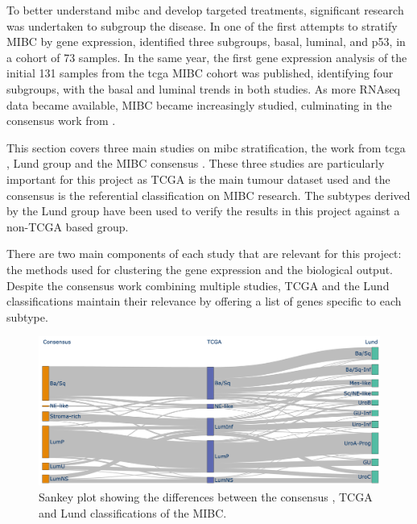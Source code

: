 
To better understand \acrlong{mibc} and develop targeted treatments, significant research was undertaken to subgroup the disease. In one of the first attempts to stratify MIBC by gene expression, \citet{Choi2014-ed} identified three subgroups, basal, luminal, and p53, in a cohort of 73 samples. In the same year, the first gene expression analysis of the initial 131 samples from the \acrlong{tcga} MIBC cohort was published, identifying four subgroups, with the basal and luminal trends in both studies. As more RNAseq data became available, MIBC became increasingly studied, culminating in the consensus work from \citep{Kamoun2020-tj}.


This section covers three main studies on \acrshort{mibc} stratification, the work from \acrshort{tcga} \citep{Robertson2017-mg}, Lund group \citep{Marzouka2018-ge} and the MIBC consensus \citep{Kamoun2020-tj}. These three studies are particularly important for this project as TCGA is the main tumour dataset used and the consensus is the referential classification on MIBC research. The subtypes derived by the Lund group have been used to verify the results in this project against a non-TCGA based group.

There are two main components of each study that are relevant for this project: the methods used for clustering the gene expression and the biological output. Despite the consensus work combining multiple studies, TCGA and the Lund classifications maintain their relevance by offering a list of genes specific to each subtype. 

\begin{figure}[!htb]   
\centering
\includegraphics[width=1.0\textwidth,height=1.0\textheight,keepaspectratio]{Sections/Lit_review/Resources/classifier_differences.png}
  \caption[Comparison between existing MIBC classifications]{Sankey plot showing the differences between the consensus \citep{Kamoun2020-tj}, TCGA \citep{Robertson2017-mg} and Lund \citep{Marzouka2018-ge} classifications of the MIBC.}
\label{fig:lit:classifier_comp}
\end{figure}

